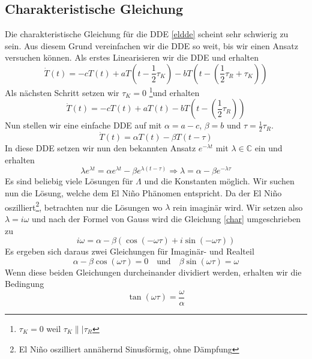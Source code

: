 \subsection{Charakteristische Gleichung}
Die charakteristische Gleichung für die DDE \eqref{eldde} scheint sehr schwierig zu sein. 
Aus diesem Grund vereinfachen wir die DDE so weit, bis wir einen Ansatz versuchen können.
Als erstes Linearisieren wir die DDE und erhalten
\begin{equation}
	\dot{T}(t)=-cT(t)+aT(t-\frac{1}{2}\tau_K)-bT(t-(\frac{1}{2}\tau_R+\tau_K))
\end{equation}
Als nächsten Schritt setzen wir $\tau_K=0$ \footnote{$\tau_K=0$ weil $\tau_K \|| \tau_R$}und erhalten
\begin{equation}
	\dot{T}(t)=-cT(t)+aT(t)-bT(t-(\frac{1}{2}\tau_R))
\end{equation}
Nun stellen wir eine einfache DDE auf mit $\alpha = a-c$, $\beta = b$ und $\tau = \frac{1}{2}\tau_R$.
\begin{equation}
	\dot{T}(t)=\alpha T(t)-\beta T(t-\tau)
\end{equation}
In diese DDE setzen wir nun den bekannten Ansatz $e^{-\lambda t}$ mit $\lambda \in \mathbb{C}$ ein und erhalten
\begin{equation} \label{char}
	\lambda e^{\lambda t} = \alpha e^{\lambda t} - \beta e^{\lambda(t-\tau)} \Longrightarrow \lambda = \alpha-\beta e^{-\lambda \tau}
\end{equation}
Es sind beliebig viele Lösungen für $\Lambda$ und die Konstanten möglich.
Wir suchen nun die Lösung, welche dem El Niño Phänomen entspricht.
Da der El Niño oszilliert\footnote{El Niño oszilliert annähernd Sinusförmig, ohne Dämpfung}, betrachten nur die Lösungen wo $\lambda$ rein imaginär wird. %
Wir setzen also $\lambda = i\omega$ und nach der Formel von Gauss wird die Gleichung \eqref{char} umgeschrieben zu 
\begin{equation}
	 i\omega = \alpha-\beta(\cos(-\omega \tau)+i\sin(-\omega \tau))
\end{equation}
Es ergeben sich daraus zwei Gleichungen für Imaginär- und Realteil
\begin{equation} \label{bed1}
  	\alpha-\beta\cos(\omega \tau) = 0 \quad\text{und}\quad \beta\sin(\omega\tau)=\omega
\end{equation}
Wenn diese beiden Gleichungen durcheinander dividiert werden, erhalten wir die Bedingung
\begin{equation} \label{bed}
	\tan(\omega\tau)=\frac{\omega}{\alpha}
\end{equation}
  	
